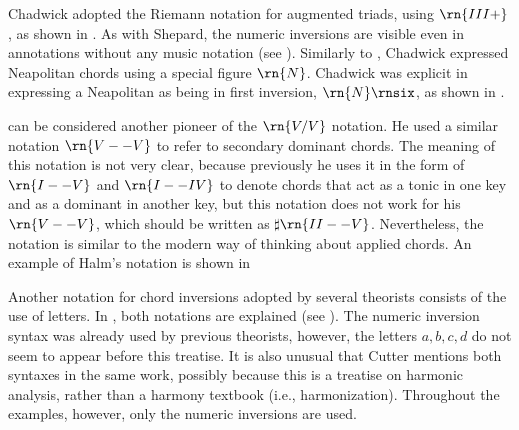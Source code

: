 




Chadwick adopted the Riemann notation for augmented triads,
using $\rn{III+}$, as shown in
. As with
Shepard, the numeric inversions are visible even in
annotations without any music notation (see
). Similarly
to \textcite{emery1879elements}, Chadwick expressed
Neapolitan chords using a special figure $\rn{N}$. Chadwick
was explicit in expressing a Neapolitan as being in first
inversion, $\rn{N}\rnsix$, as shown in
.

\textcite{halm1900harmonielehre} can be considered another
pioneer of the $\rn{V/V}$ notation. He used a similar
notation $\rn{V--V}$ to refer to secondary dominant chords.
The meaning of this notation is not very clear, because
previously he uses it in the form of $\rn{I--V}$ and
$\rn{I--IV}$ to denote chords that act as a tonic in one key
and as a dominant in another key, but this notation does not
work for his $\rn{V--V}$, which should be written as
$\sharp{}\rn{II--V}$. Nevertheless, the notation is similar
to the modern way of thinking about applied chords. An
example of Halm's notation is shown in



Another notation for chord inversions adopted by several
theorists consists of the use of letters. In
\textcite{cutter1902harmonic}, both notations are explained
(see ). The
numeric inversion syntax was already used by previous
theorists, however, the letters ${a, b, c , d}$ do not seem
to appear before this treatise. It is also unusual that
Cutter mentions both syntaxes in the same work, possibly
because this is a treatise on harmonic analysis, rather than
a harmony textbook (i.e., harmonization). Throughout the
examples, however, only the numeric inversions are used.

